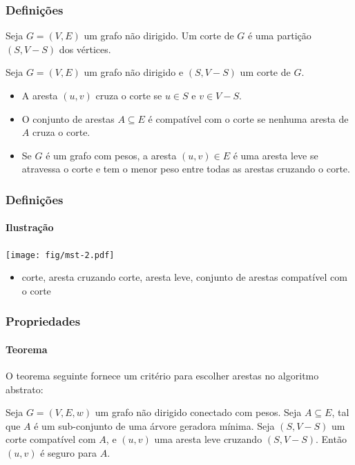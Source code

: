 \documentclass{beamer}
\begin{document}
\begin{frame}
\frametitle{Definições}

\begin{definition}[Corte]
Seja $G=(V, E)$ um grafo não dirigido. Um \alert{corte} de $G$ é uma
partição $(S, V - S)$ dos vértices.
\end{definition}

\begin{definition}
Seja $G=(V, E)$ um grafo não dirigido e $(S, V - S)$ um corte de
$G$. 
\begin{itemize}
\item A aresta $(u, v)$ \alert{cruza} o corte se $u \in S$ e $v \in
  V-S$.
\item O conjunto de arestas $A \subseteq E$ \alert{é compatível com} o
  corte se nenhuma aresta de $A$ cruza o corte.
\item Se $G$ é um grafo com pesos, a aresta $(u, v) \in E$ é uma
  \alert{aresta leve} se atravessa o corte e tem o menor peso entre
  todas as arestas cruzando o corte.
\end{itemize}
\end{definition}

\end{frame}

\begin{frame}
\frametitle{Definições}
\framesubtitle{Ilustração}

\begin{center}
\texttt{[image: fig/mst-2.pdf]}
\end{center}

\begin{itemize}
\item corte, aresta cruzando corte, aresta leve, conjunto de arestas
compatível com o corte
\end{itemize}

\end{frame}

\begin{frame}
\frametitle{Propriedades}
\framesubtitle{Teorema}

O teorema seguinte fornece um critério para escolher arestas
no algoritmo abstrato:
\begin{theorem}
Seja $G = (V, E, w)$ um grafo não dirigido conectado com pesos.  Seja
$A \subseteq E$, tal que $A$ é um sub-conjunto de uma árvore geradora
mínima. Seja $(S, V-S)$ um corte compatível com $A$, e $(u, v)$ uma
aresta leve cruzando $(S, V-S)$. Então $(u, v)$ é seguro para $A$.
\end{theorem}
\end{frame}
\end{document}
